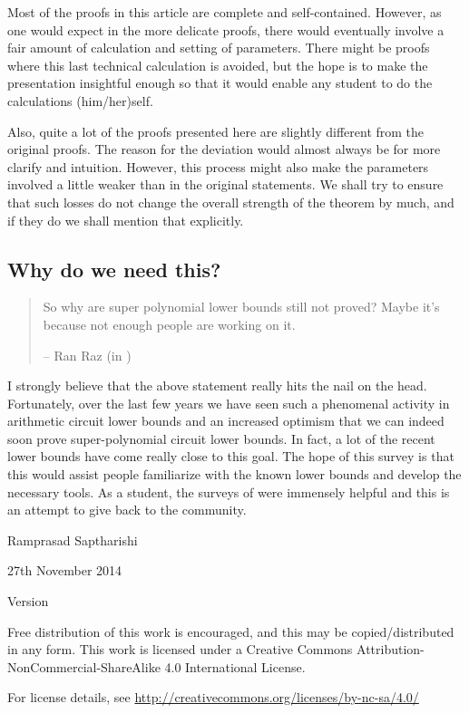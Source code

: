 Most of the proofs in this article are complete and self-contained. 
However, as one would expect in the more delicate proofs, there would eventually involve a fair amount of calculation and setting of parameters. 
There might be proofs where this last technical calculation is avoided, but the hope is to make the presentation insightful enough so that it would enable any student to do the calculations (him/her)self.

Also, quite a lot of the proofs presented here are slightly different from the original proofs. 
The reason for the deviation would almost always be for more clarify and intuition. 
However, this process might also make the parameters involved a little weaker than in the original statements. 
We shall try to ensure that such losses do not change the overall strength of the theorem by much, and if they do we shall mention that explicitly. \\

\subsection*{Why do we need this?}

\begin{quote}
So why are super polynomial lower bounds still not proved?  Maybe it's because not enough people are working on it.  
\begin{flushright}
-- Ran Raz (in \cite{raz10fool})
\end{flushright}
\end{quote}


I strongly believe that the above statement really hits the nail on the head. 
Fortunately, over the last few years we have seen such a phenomenal activity in arithmetic circuit lower bounds and an increased optimism that we can indeed soon prove super-polynomial circuit lower bounds. 
In fact, a lot of the recent lower bounds have come really close to this goal. 
The hope of this survey is that this would assist people familiarize with the known lower bounds and develop the necessary tools. 
As a student, the surveys of \cite{sy,ckw11} were immensely helpful and this is an attempt to give back to the community. 

\vspace*{2cm}

\noindent
Ramprasad Saptharishi

\noindent
27th November 2014

\noindent 
Version \currentversion\\

\noindent
\ccbyncsa

\medskip

\noindent
Free distribution of this work is encouraged, and this may be copied/distributed in any form. 
This work is licensed under a Creative Commons Attribution-NonCommercial-ShareAlike 4.0 International License.

For license details, see \url{http://creativecommons.org/licenses/by-nc-sa/4.0/}


